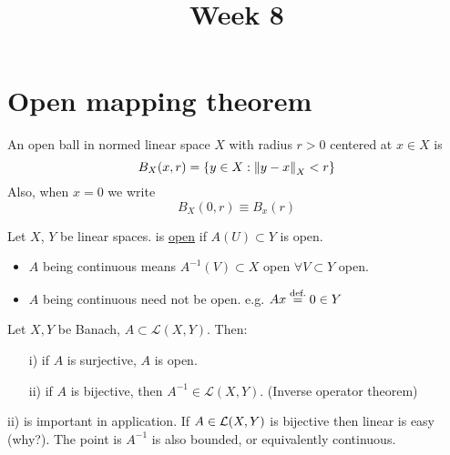 \documentclass{article}
\title{Week 8}
\begin{document}
\maketitle
\section{Open mapping theorem}
\begin{definition}\nl
An open ball in normed linear space $X$ with radius $r>0$ centered at $x\in X$ is
$$
B_X(x,r)=\{y\in X:\left\|{y-x}\right\|_X<r\}
$$
Also, when $x=0$ we write 
$$
B_X(0,r)\equiv B_x(r)
$$
\end{definition}

\begin{definition}\nl
	Let $X$, $Y$ be linear spaces.  is {\underline{open}} if $A(U)\subset Y $ is open.
\end{definition}
\begin{remark}
\phantom{something}
\begin{itemize}
    \item $A$ being continuous means $A^{-1}(V)\subset{X}$ open $\forall V\subset Y$ open.
    \item $A$ being continuous need not be open. e.g. $Ax \stackrel{\text{def.}}{=} 0\in Y$
\end{itemize}
\end{remark}

\begin{theorem}\nl
\label{open mapping theorem}
	Let $X,Y$ be Banach, $A\subset\mathcal{L}(X,Y)$. Then:
	\begin{itemize}
	    \item[i)] if $A$ is surjective, $A$ is open.
	    \item[ii)] if $A$ is bijective, then $A^{-1}\in \mathcal{L}(X,Y)$. (Inverse operator theorem)
	\end{itemize}
\end{theorem}

\begin{remark}\nl
ii) is important in application. If $A\in\mathcal{L}({X},{Y})$ is bijective then  linear is easy (why?). The point is $A^{-1}$ is also bounded, or equivalently continuous.
\end{remark}
\end{document}
